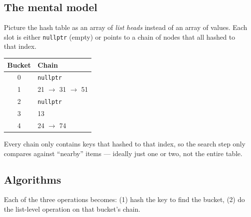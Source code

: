 \documentclass[11pt]{article}
\begin{document}
\subsection*{The mental model}

Picture the hash table as an array of \emph{list heads} instead
of an array of values. Each slot is either \texttt{nullptr}
(empty) or points to a chain of nodes that all hashed to that
index.

\begin{center}
\begin{tabular}{|c|l|}
\hline
\textbf{Bucket} & \textbf{Chain} \\
\hline
0 & \texttt{nullptr} \\
1 & 21 $\to$ 31 $\to$ 51 \\
2 & \texttt{nullptr} \\
3 & 13 \\
4 & 24 $\to$ 74 \\
\hline
\end{tabular}
\end{center}

Every chain only contains keys that hashed to that index, so the
search step only compares against ``nearby'' items --- ideally
just one or two, not the entire table.

\subsection*{Algorithms}

Each of the three operations becomes: (1) hash the key to find
the bucket, (2) do the list-level operation on that bucket's
chain.
\end{document}
